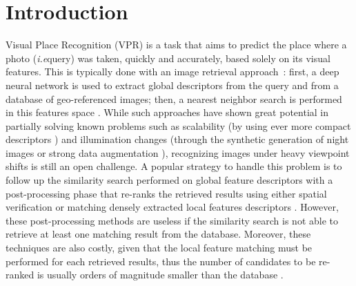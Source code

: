 \documentclass[10pt,twocolumn,letterpaper]{article}
\def\ie{\emph{i.e}\onedot}
\begin{document}
\section{Introduction}
\label{sec:introduction}
Visual Place Recognition (VPR) is a task that aims to predict the place where a photo (\ie query) was taken, quickly and accurately, based solely on its visual features. This is typically done with an image retrieval approach~\cite{Torii_2015_pitts250k, Chen_2017a,  Kim_2017_crn, Chen_2017b, Arandjelovic_2018_netvlad, Chen_2018, Torii_2018_tokyo247, Hausler_2019, Garg_2019,  Liu_2019_sare, Doan_2019,  Ge_2020_sfrs, Khaliq_2020,  Warburg_2020_msls, Torii_2021_r_sf, Hausler_2021_patch_netvlad, Ibrahimi_2021_insideout_vpr, Zaffar_2021_vprbench, Mereu_2022_seqvlad, Alibey_2022_gsvcities, Berton_2022_cosPlace, Berton_2022_benchmark, Alibey_2023_mixvpr, Leyvavallina_2021_gcl}: first, a deep neural network is used to extract global descriptors from the query and from a database of geo-referenced images; then, a nearest neighbor search is performed in this features space \cite{Arandjelovic_2018_netvlad, Liu_2019_sare, Kim_2017_crn, Ge_2020_sfrs, Berton_2022_cosPlace, Alibey_2023_mixvpr, Alibey_2022_gsvcities}.
While such approaches have shown great potential in partially solving known problems such as scalability (by using ever more compact descriptors \cite{Zhu_2018_apanet, Berton_2022_cosPlace, Alibey_2023_mixvpr}) and illumination changes (through the synthetic generation of night images \cite{Berton_2021_svox, Porav_2018_gan_for_geoloc, Asha_2019_todaygan} or strong data augmentation \cite{Ge_2020_sfrs}), 
recognizing images under heavy viewpoint shifts is still an open challenge.
A popular strategy to handle this problem is to follow up the similarity search performed on global feature descriptors with a post-processing phase that re-ranks the retrieved results using either spatial verification \cite{Cao_2020_delg, Liu_2020_densernet, Hausler_2021_patch_netvlad} or matching densely extracted local features descriptors \cite{Berton_2021_geowarp}.
However, these post-processing methods are useless if the similarity search is not able to retrieve at least one matching result from the database. Moreover, these techniques are also costly, given that the local feature matching must be performed for each retrieved results, thus the number of candidates to be re-ranked is usually orders of magnitude smaller than the database \cite{Cao_2020_delg, Berton_2021_geowarp, Hausler_2021_patch_netvlad, Liu_2020_densernet}.
\end{document}
